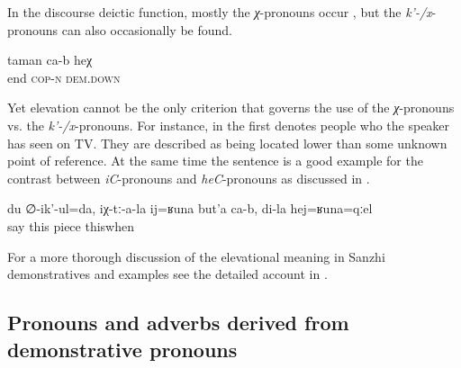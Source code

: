 In the discourse deictic function, mostly the \textit{χ}-pronouns occur , but the \textit{k'-/x}-pronouns can also occasionally be found.

\begin{exe}
	\ex	\label{This is the end (of the story).}
	\gll	taman	ca-b	heχ \\
		end	\textsc{cop-n}	\textsc{dem.down}\\
	\glt	{}
\end{exe}


Yet elevation cannot be the only criterion that governs the use of the \textit{χ}-pronouns vs. the \textit{k'-/x}-pronouns. For instance, in  the first  denotes people who the speaker has seen on TV. They are described as being located lower than some unknown point of reference. At the same time the sentence is a good example for the contrast between \textit{iC}-pronouns and \textit{heC}-pronouns as discussed in . 

\begin{exe}
	\ex	\label{I (masc.) say, they have a (little) piece (of a diamond) like this, while I have one like this}
	\gll	du	∅-ik'-ul=da,	iχ-tː-a-la	ij=ʁuna	but'a	ca-b,	di-la	hej=ʁuna=qːel \\
			say		this	piece			thiswhen\\
	\glt	{}
\end{exe}

For a more thorough discussion of the elevational meaning in Sanzhi demonstratives and examples see the detailed account in \citet{ForkerLTSanzhi}.\pagebreak

\subsection{Pronouns and adverbs derived from demonstrative pronouns}
\label{ssec:Pronouns and adverbs derived from demonstrative pronouns}


